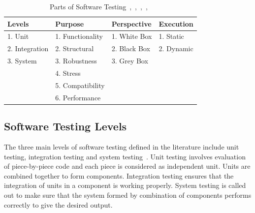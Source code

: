 \begin{table}[ht]
\caption{Parts of Software Testing~\cite{adrion1982validation},~\cite{chilenski1994applicability},~\cite{gaudel2010software},~\cite{richardson1992specification},~\cite{tracey1998automated}} %
\smallskip
\centering %
\begin{tabular}{| l | l | l | l | } %
\hline

Levels 		&Purpose		 						& Perspective		& Execution 	\\
\hline
1. Unit		&1. Functionality						& 1. White Box		& 1. Static 	\\
2. Integration	&2. Structural							& 2. Black Box		& 2. Dynamic	\\
3. System		&3. Robustness						& 3. Grey Box		&			\\
			&4. Stress								&				&			\\
			&5. Compatibility						&				&			\\
			&6. Performance						&				&			\\



\hline %
\end{tabular}
\bigskip
\label{table:addvalues} %
\end{table}


\subsection{Software Testing Levels}
The three main levels of software testing defined in the literature include unit testing, integration testing and system testing~\cite{chilenski1994applicability}. Unit testing involves evaluation of piece-by-piece code and each piece is considered as independent unit. Units are combined together to form components. Integration testing ensures that the integration of units in a component is working properly. System testing is called out to make sure that the system formed by combination of components performs correctly to give the desired output.

